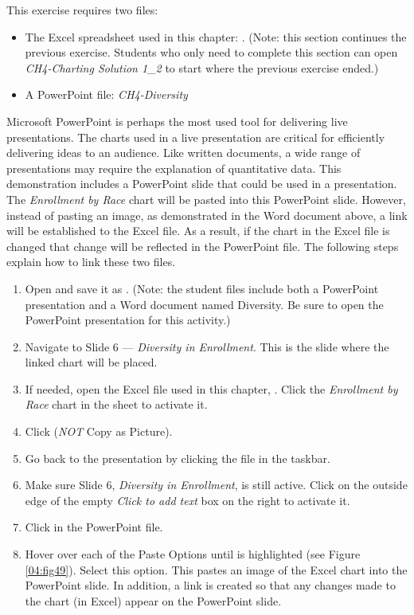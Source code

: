 This exercise requires two files:

\begin{itemize}
	\item The Excel spreadsheet used in this chapter: . (Note: this section continues the previous exercise. Students who only need to complete this section can open \textit{CH4-Charting Solution 1\_2} to start where the previous exercise ended.)
	\item A PowerPoint file: \textit{CH4-Diversity}
\end{itemize}

Microsoft PowerPoint is perhaps the most used tool for delivering live presentations. The charts used in a live presentation are critical for efficiently delivering ideas to an audience. Like written documents, a wide range of presentations may require the explanation of quantitative data. This demonstration includes a PowerPoint slide that could be used in a presentation. The \textit{Enrollment by Race} chart will be pasted into this PowerPoint slide. However, instead of pasting an image, as demonstrated in the Word document above, a link will be established to the Excel file. As a result, if the chart in the Excel file is changed that change will be reflected in the PowerPoint file. The following steps explain how to link these two files.

\begin{enumerate}
	\item Open  and save it as . (Note: the student files include both a PowerPoint presentation and a Word document named Diversity. Be sure to open the PowerPoint presentation for this activity.) 
	\item Navigate to Slide $ 6 $ --- \textit{Diversity in Enrollment}. This is the slide where the linked chart will be placed.
	\item If needed, open the Excel file used in this chapter, . Click the \textit{Enrollment by Race} chart in the  sheet to activate it.
	\item Click  (\textit{NOT} Copy as Picture).
	\item Go back to the  presentation by clicking the file in the taskbar.
	\item Make sure Slide 6, \textit{Diversity in Enrollment}, is still active. Click on the outside edge of the empty \textit{Click to add text} box on the right to activate it.
	\item Click  in the PowerPoint file.
	\item Hover over each of the Paste Options until  is highlighted (see Figure \ref{04:fig49}). Select this option. This pastes an image of the Excel chart into the PowerPoint slide. In addition, a link is created so that any changes made to the chart (in Excel) appear on the PowerPoint slide.
\end{enumerate}

